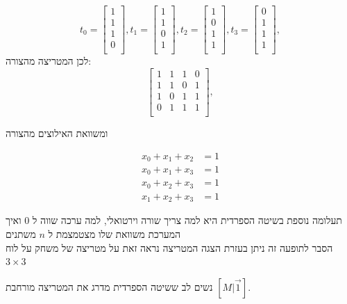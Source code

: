 \documentclass[12pt,leqno]{article}
\begin{document}
\[
   t_0 = 
    \begin{bmatrix}
        1 \\
        1 \\
        1 \\
        0 \\
    \end{bmatrix},
    t_1 = 
    \begin{bmatrix}
        1 \\
        1 \\
        0 \\
        1 \\
    \end{bmatrix},
    t_2 = 
    \begin{bmatrix}
        1 \\
        0 \\
        1 \\
        1 \\
    \end{bmatrix},
    t_3 = 
    \begin{bmatrix}
        0 \\
        1 \\
        1 \\
        1 \\
    \end{bmatrix},
\]
לכן
המטריצה מהצורה:
\[
    \begin{bmatrix}
        1 & 1 & 1 &0 \\
        1 & 1 & 0 & 1 \\
        1 & 0 & 1 & 1 \\
        0 & 1 & 1 & 1 \\
    \end{bmatrix},
\]

ומשוואת האילוצים
מהצורה 

\begin{align*}
    x_0 + x_1 + x_2 &= 1\\
    x_0 + x_1 + x_3 &= 1\\
    x_0 + x_2 + x_3 &= 1\\
    x_1 + x_2 + x_3 &= 1
\end{align*}

תעלומה נוספת בשיטה הספרדית היא למה צריך שורה וירטואלי, למה ערכה 
שווה ל
$0$
ואיך המערכת משוואת שלו מצטמצמת ל
$n$
משתנים
\\
הסבר לתופעה זה
ניתן בעזרת הצגה המטריצה
נראה זאת על מטריצה 
של משחק 
על לוח 
$3 \times 3$

נשים לב ששיטה הספרדית מדרג את המטריצה מורחבת 
$[M | \vec{1}]$.
\end{document}
